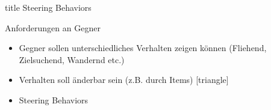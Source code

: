 \begin{frame}
\vfill
\centering
\begin{beamercolorbox}[sep=8pt,center,shadow=true,rounded=true]{title}
Steering Behaviors
\end{beamercolorbox}
\vfill
\end{frame}

\begin{frame}{Anforderungen an Gegner}
\begin{itemize}
    \item Gegner sollen unterschiedliches Verhalten zeigen können (Fliehend, Zielsuchend, Wandernd etc.)
    \item Verhalten soll änderbar sein (z.B. durch Items)
    \newline
    [triangle]
    \item Steering Behaviors
\end{itemize}
\end{frame}